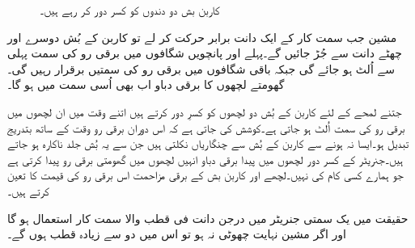 \begin{figure}
%
\caption{کاربن بش دو دندوں کو کسر دور کر رہے ہیں۔}
\label{شکل_یکسمتی_دندے_کسرے_دور}
\end{figure}

مشین جب سمت کار کے ایک دانت برابر حرکت کر لے تو کاربن کے بُش دوسرے اور چھٹے دانت سے جُڑ جائیں گے۔پہلے اور پانچویں شگافوں میں برقی رو کی سمت پہلی سے اُلٹ ہو جائے گی جبکہ باقی شگافوں میں برقی رو کی سمتیں برقرار رہیں گی۔گھومتے لچھوں کا برقی دباو اب بھی اُسی سمت میں ہو گا۔

جتنے لمحے کے لئے  کاربن کے بُش دو لچھوں کو کسرِ دور کرتے ہیں اتنے وقت میں ان لچھوں میں برقی رو کی سمت اُلٹ ہو جاتی ہے۔کوشش کی جاتی ہے کہ  اس دوران برقی رو وقت کے ساتھ بتدریج تبدیل ہو۔ایسا نہ ہونے سے کاربن کے بُش سے چنگاریاں نکلتی ہیں جن سے یہ بُش جلد ناکارہ ہو جاتے ہیں۔جنریٹر کے کسر دور لچھوں میں پیدا برقی دباو انہیں لچھوں میں گھومتی برقی رو پیدا کرتی ہے جو ہمارے کسی کام کی نہیں۔لچھے اور کاربن بش کے برقی مزاحمت اس برقی رو کی قیمت کا تعین کرتے ہیں۔ 

حقیقت میں یک سمتی جنریٹر میں درجن دانت فی قطب والا سمت کار استعمال ہو گا اور اگر مشین نہایت چھوٹی نہ ہو تو اس میں دو سے زیادہ قطب ہوں گے۔


